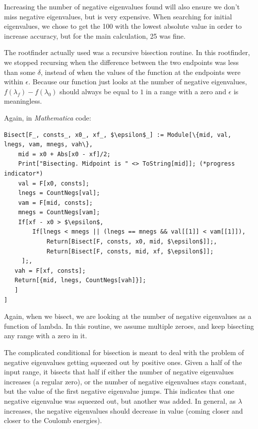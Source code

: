 \documentclass[12pt,twoside]{reedthesis}
\begin{document}
Increasing the number of negative eigenvalues found will also ensure we don't miss negative eigenvalues, but is very expensive. When searching for initial eigenvalues, we chose to get the 100 with the lowest absolute value in order to increase accuracy, but for the main calculation, 25 was fine.

The rootfinder actually used was a recursive bisection routine. In this rootfinder, we stopped recursing when the difference between the two endpoints was less than some $\delta$, instead of when the values of the function at the endpoints were within $\epsilon$. Because our function just looks at the number of negative eigenvalues, $f(\lambda_f) - f(\lambda_0)$ should always be equal to $1$ in a range with a zero and $\epsilon$ is meaningless. 

Again, in \emph{Mathematica} code:

\begin{Verbatim}[commandchars=\\\{\}, codes={\catcode`$=3}]
Bisect[F_, consts_, x0_, xf_, $\epsilon$_] := Module[\{mid, val, lnegs, vam, mnegs, vah\},
    mid = x0 + Abs[x0 - xf]/2;
    Print["Bisecting. Midpoint is " <> ToString[mid]]; (*progress indicator*)
    val = F[x0, consts];
    lnegs = CountNegs[val];
    vam = F[mid, consts];
    mnegs = CountNegs[vam];
    If[xf - x0 > $\epsilon$,
        If[lnegs < mnegs || (lnegs == mnegs && val[[1]] < vam[[1]]), 
            Return[Bisect[F, consts, x0, mid, $\epsilon$]];, 
            Return[Bisect[F, consts, mid, xf, $\epsilon$]]; 
     ];,
   vah = F[xf, consts];
   Return[{mid, lnegs, CountNegs[vah]}];
   ]
]
\end{Verbatim}

Again, when we bisect, we are looking at the number of negative eigenvalues as a function of lambda. In this routine, we assume multiple zeroes, and keep bisecting any range with a zero in it.

The complicated conditional for bisection is meant to deal with the problem of negative eigenvalues getting squeezed out by positive ones. Given a half of the input range, it bisects that half if either the number of negative eigenvalues increases (a regular zero), or the number of negative eigenvalues stays constant, but the value of the first negative eigenvalue jumps. This indicates that one negative eigenvalue was squeezed out, but another was added. In general, as $\lambda$ increases, the negative eigenvalues should decrease in value (coming closer and closer to the Coulomb energies). 
\end{document}
